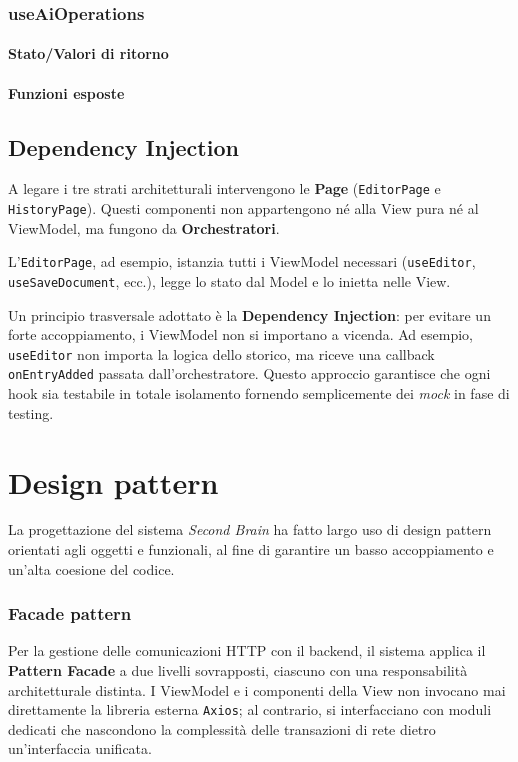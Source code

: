 \documentclass[11pt,a4paper]{article}
\begin{document}
\subsubsection{useAiOperations}
\paragraph{Stato/Valori di ritorno}
\paragraph{Funzioni esposte}


\newpage
\subsection{Dependency Injection}
A legare i tre strati architetturali intervengono le \textbf{Page} (\texttt{EditorPage} e \texttt{HistoryPage}). Questi componenti non appartengono né alla View pura né al ViewModel, ma fungono da \textbf{Orchestratori}.

L'\texttt{EditorPage}, ad esempio, istanzia tutti i ViewModel necessari (\texttt{useEditor}, \texttt{useSaveDocument}, ecc.), legge lo stato dal Model e lo inietta nelle View. 

Un principio trasversale adottato è la \textbf{Dependency Injection}: per evitare un forte accoppiamento, i ViewModel non si importano a vicenda. Ad esempio, \texttt{useEditor} non importa la logica dello storico, ma riceve una callback \texttt{onEntryAdded} passata dall'orchestratore. Questo approccio garantisce che ogni hook sia testabile in totale isolamento fornendo semplicemente dei \textit{mock} in fase di testing.


\newpage

\section{Design pattern}
La progettazione del sistema \textit{Second Brain} ha fatto largo uso di design pattern orientati agli oggetti e funzionali, al fine di garantire un basso accoppiamento e un'alta coesione del codice.

\subsubsection{Facade pattern}
Per la gestione delle comunicazioni HTTP con il backend, il sistema applica il \textbf{Pattern Facade} a due livelli sovrapposti, ciascuno con una responsabilità architetturale distinta. I ViewModel e i componenti della View non invocano mai direttamente la libreria esterna \texttt{Axios}; al contrario, si interfacciano con moduli dedicati che nascondono la complessità delle transazioni di rete dietro un'interfaccia unificata.
\end{document}

